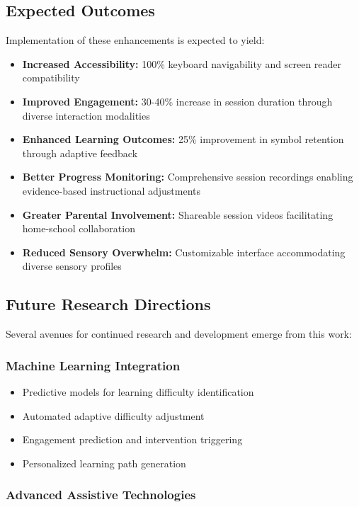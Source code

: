 \documentclass[12pt, a4paper]{article}
\begin{document}
\subsection{Expected Outcomes}

Implementation of these enhancements is expected to yield:

\begin{itemize}[leftmargin=*]
    \item \textbf{Increased Accessibility:} 100\% keyboard navigability and screen reader compatibility
    \item \textbf{Improved Engagement:} 30-40\% increase in session duration through diverse interaction modalities
    \item \textbf{Enhanced Learning Outcomes:} 25\% improvement in symbol retention through adaptive feedback
    \item \textbf{Better Progress Monitoring:} Comprehensive session recordings enabling evidence-based instructional adjustments
    \item \textbf{Greater Parental Involvement:} Shareable session videos facilitating home-school collaboration
    \item \textbf{Reduced Sensory Overwhelm:} Customizable interface accommodating diverse sensory profiles
\end{itemize}

\subsection{Future Research Directions}

Several avenues for continued research and development emerge from this work:

\subsubsection{Machine Learning Integration}

\begin{itemize}[leftmargin=*]
    \item Predictive models for learning difficulty identification
    \item Automated adaptive difficulty adjustment
    \item Engagement prediction and intervention triggering
    \item Personalized learning path generation
\end{itemize}

\subsubsection{Advanced Assistive Technologies}
\end{document}
